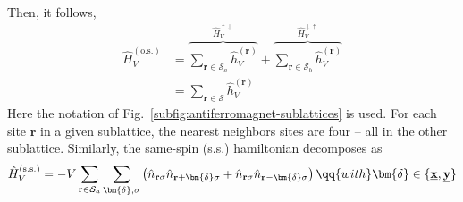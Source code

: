{Then, it follows,
\begin{align}
	\hat H_V^{(\mathrm{o.s.})} &= \overbrace{
		\sum_{\mathbf{r} \in \mathcal{S}_a} \hat h_V^{(\mathbf{r})}
	}^{\hat H_V^{\uparrow\downarrow}} + \overbrace{
		\sum_{\mathbf{r} \in \mathcal{S}_b} \hat h_V^{(\mathbf{r})}
	}^{\hat H_V^{\downarrow\uparrow}} \nonumber \\
	&= \sum_{\mathbf{r} \in \mathcal{S}} \hat h_V^{(\mathbf{r})} \label{eq:ehm-mft-nonlocal-opposite-spin}
\end{align}
Here the notation of Fig.~\ref{subfig:antiferromagnet-sublattices} is used. For each site $\mathbf{r}$ in a given sublattice, the nearest neighbors sites are four -- all in the other sublattice. Similarly, the same-spin (s.s.) hamiltonian decomposes as
\[
\hat H_V^{(\mathrm{s.s.})} = -V \sum_{\mathbf{r} \in \mathcal{S}_a} \sum_{\bm{\delta},\sigma} \left(
\hat n_{\mathbf{r}\sigma} \hat n_{\mathbf{r}+\bm{\delta} \sigma} + \hat n_{\mathbf{r}\sigma} \hat n_{\mathbf{r}-\bm{\delta}\sigma}
\right)
\qq{with}
\bm{\delta} \in \lbrace
\underline{\mathbf{x}},\underline{\mathbf{y}}
\rbrace
\]
%
%

}
